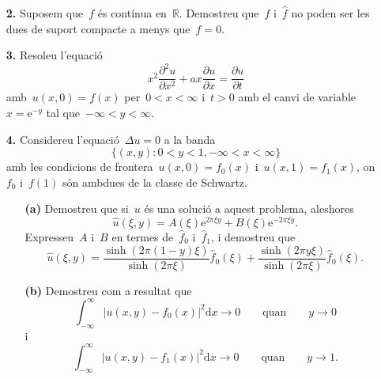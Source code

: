 \documentclass[a4paper]{article}
\theoremstyle{plain}
\newcommand{\e}{\mathrm{e}}
\providecommand{\uppi}{\pi}
\newcommand{\diff}{\mathrm{d}}
\newcommand{\abs}[1]{\lvert{#1}\rvert}
\newcommand{\RR}{\mathbb{R}}
\begin{document}
\begin{enumerate}
    \item[\textbf{2.}] Suposem que~\(f\) és contínua en~\(\RR\).
        Demostreu que~\(f\) i~\(\widehat{f}\) no poden ser les dues de suport
        compacte a menys que~\(f=0\).
\end{enumerate}

\begin{enumerate}
    \item[\textbf{3.}] Resoleu l'equació
        \[
            x^{2}\frac{\partial^{2}u}{\partial x^{2}}
            + ax\frac{\partial u}{\partial x}
            = \frac{\partial u}{\partial t}
        \]
        amb~\(u(x,0) = f(x)\) per~\(0<x<\infty\) i~\(t>0\) amb el canvi de
        variable~\(x=\e^{-y}\) tal que~\(-\infty<y<\infty\).
\end{enumerate}

\begin{enumerate}
    \item[\textbf{4.}] Considereu l'equació~\(\Delta u=0\) a la banda
        \[
            \{(x,y):0<y<1, -\infty<x<\infty\}
        \]
        amb les condicions de frontera~\(u(x,0)=f_{0}(x)\)
        i~\(u(x,1)=f_{1}(x)\), on~\(f_{0}\) i~\(f(1)\) són ambdues de la classe
        de Schwartz.
        \begin{enumerate}
            \item[\textbf{(a)}] Demostreu que si~\(u\) és una solució a aquest
                problema, aleshores
                \[
                    \widehat{u}(\xi,y) =
                    A(\xi)\e^{2\uppi\xi y}
                    +
                    B(\xi)\e^{-2\uppi\xi y}.
                \]
                Expresseu~\(A\) i~\(B\) en termes de~\(\widehat{f}_{0}\)
                i~\(\widehat{f}_{1}\), i demostreu que
                \[
                    \widehat{u}(\xi,y) =
                    \frac{\sinh(2\uppi(1-y)\xi)}{\sinh(2\uppi\xi)}
                    \widehat{f}_{0}(\xi)
                    +
                    \frac{\sinh(2\uppi y\xi)}{\sinh(2\uppi\xi)}
                    \widehat{f}_{0}(\xi).
                \]
        \end{enumerate}
\end{enumerate}

\begin{enumerate}
    \item[]\begin{enumerate}
        \item[\textbf{(b)}] Demostreu com a resultat que
            \[
                \int_{-\infty}^{\infty}
                \abs{u(x,y) - f_{0}(x)}^{2}
                \diff x
                \to 0
                \qquad\text{quan}\qquad
                y\to 0
            \]
            i
            \[
                \int_{-\infty}^{\infty}
                \abs{u(x,y) - f_{1}(x)}^{2}
                \diff x
                \to 0
                \qquad\text{quan}\qquad
                y\to 1.
            \]
    \end{enumerate}
\end{enumerate}
\end{document}
